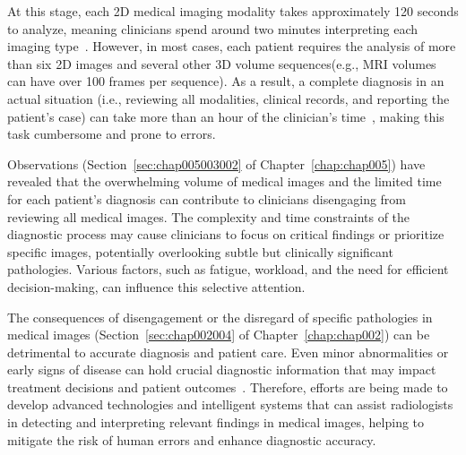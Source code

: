 At this stage, each 2D medical imaging modality takes approximately 120 seconds to analyze, meaning clinicians spend around two minutes interpreting each imaging type~\cite{jiang2018interpretation}.
However, in most cases, each patient requires the analysis of more than six 2D images and several other 3D volume sequences\footnotemark[16] (e.g., MRI volumes can have over 100 frames per sequence).
As a result, a complete diagnosis in an actual situation (i.e., reviewing all modalities, clinical records, and reporting the patient's case) can take more than an hour of the clinician's time~\cite{Forsberg2017}, making this task cumbersome and prone to errors.


Observations (Section~\ref{sec:chap005003002} of Chapter~\ref{chap:chap005}) have revealed that the overwhelming volume of medical images and the limited time for each patient's diagnosis can contribute to clinicians disengaging from reviewing all medical images.
The complexity and time constraints of the diagnostic process may cause clinicians to focus on critical findings or prioritize specific images, potentially overlooking subtle but clinically significant pathologies.
Various factors, such as fatigue, workload, and the need for efficient decision-making, can influence this selective attention.

The consequences of disengagement or the disregard of specific pathologies in medical images (Section~\ref{sec:chap002004} of Chapter~\ref{chap:chap002}) can be detrimental to accurate diagnosis and patient care.
Even minor abnormalities or early signs of disease can hold crucial diagnostic information that may impact treatment decisions and patient outcomes~\cite{doi:10.1148/radiol.2020192534}.
Therefore, efforts are being made to develop advanced technologies and intelligent systems that can assist radiologists in detecting and interpreting relevant findings in medical images, helping to mitigate the risk of human errors and enhance diagnostic accuracy.

